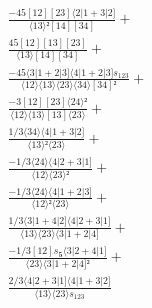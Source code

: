 \documentclass[varwidth, border=5pt]{standalone}
\begin{document}
\begin{my}
$\begin{gathered}
\scriptscriptstyle\frac{-45[12][23]⟨2|1+3|2]}{⟨13⟩²[14][34]} +\\
\scriptscriptstyle\frac{45[12][13][23]}{⟨13⟩[14][34]} +\\
\scriptscriptstyle\frac{-45⟨3|1+2|3]⟨4|1+2|3]s_{123}}{⟨12⟩⟨13⟩⟨23⟩⟨34⟩[34]²} +\\
\scriptscriptstyle\frac{-3[12][23]⟨24⟩²}{⟨12⟩⟨13⟩[13]⟨23⟩} +\\
\scriptscriptstyle\frac{1/3⟨34⟩⟨4|1+3|2]}{⟨13⟩²⟨23⟩} +\\
\scriptscriptstyle\frac{-1/3⟨24⟩⟨4|2+3|1]}{⟨12⟩⟨23⟩²} +\\
\scriptscriptstyle\frac{-1/3⟨24⟩⟨4|1+2|3]}{⟨12⟩²⟨23⟩} +\\
\scriptscriptstyle\frac{1/3⟨3|1+4|2]⟨4|2+3|1]}{⟨13⟩⟨23⟩⟨3|1+2|4]} +\\
\scriptscriptstyle\frac{-1/3[12]s_{𝟓}⟨3|2+4|1]}{⟨23⟩⟨3|1+2|4]²} +\\
\scriptscriptstyle\frac{2/3⟨4|2+3|1]⟨4|1+3|2]}{⟨13⟩⟨23⟩s_{123}} \phantom{+}
\end{gathered}$
\end{my}
\end{document}
